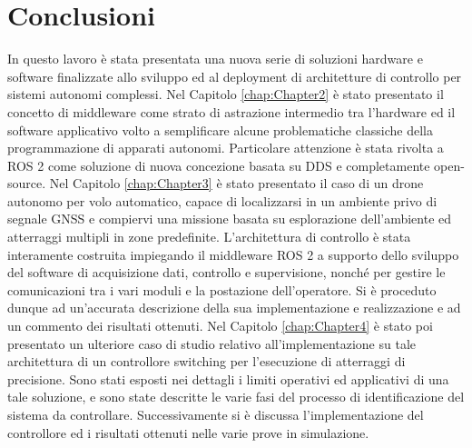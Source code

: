 
\chapter[Conclusioni]{Conclusioni}
\label{chap:Chapter5} 
\doublespacing
\fontsize{12}{12}\selectfont
\indent In questo lavoro è stata presentata una nuova serie di soluzioni hardware e software finalizzate allo sviluppo ed al deployment di architetture di controllo per sistemi autonomi complessi. Nel Capitolo \ref{chap:Chapter2} è stato presentato il concetto di middleware come strato di astrazione intermedio tra l'hardware ed il software applicativo volto a semplificare alcune problematiche classiche della programmazione di apparati autonomi. Particolare attenzione è stata rivolta a ROS 2 come soluzione di nuova concezione basata su DDS e completamente open-source. Nel Capitolo \ref{chap:Chapter3} è stato presentato il caso di un drone autonomo per volo automatico, capace di localizzarsi in un ambiente privo di segnale GNSS e compiervi una missione basata su esplorazione dell'ambiente ed atterraggi multipli in zone predefinite. L'architettura di controllo è stata interamente costruita impiegando il middleware ROS 2 a supporto dello sviluppo del software di acquisizione dati, controllo e supervisione, nonché per gestire le comunicazioni tra i vari moduli e la postazione dell'operatore. Si è proceduto dunque ad un'accurata descrizione della sua implementazione e realizzazione e ad un commento dei risultati ottenuti. Nel Capitolo \ref{chap:Chapter4} è stato poi presentato un ulteriore caso di studio relativo all'implementazione su tale architettura di un controllore switching per l'esecuzione di atterraggi di precisione. Sono stati esposti nei dettagli i limiti operativi ed applicativi di una tale soluzione, e sono state descritte le varie fasi del processo di identificazione del sistema da controllare. Successivamente si è discussa l'implementazione del controllore ed i risultati ottenuti nelle varie prove in simulazione.

